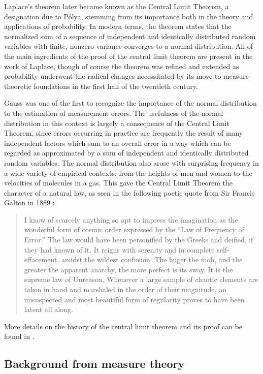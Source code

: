 \documentclass{svjour3}
\begin{document}
Laplace's theorem later became known as the Central Limit Theorem, a designation due to P\'olya, stemming from its importance both in the theory and applications of probability. In modern terms, the theorem states that the normalized sum of a sequence of independent and identically distributed random variables with finite, nonzero variance converges to a normal distribution. All of the main ingredients of the proof of the central limit theorem are present in the work of Laplace, though of course the theorem was refined and extended as probability underwent the radical changes necessitated by its move to measure-theoretic foundations in the first half of the twentieth century.

Gauss was one of the first to recognize the importance of the normal distribution to the estimation of measurement errors. The usefulness of the normal distribution in this context is largely a consequence of the Central Limit Theorem, since errors occurring in practice are frequently the result of many independent factors which sum to an overall error in a way which can be regarded as approximated by a sum of independent and identically distributed random variables. The normal distribution also arose with surprising frequency in a wide variety of empirical contexts, from the heights of men and women to the velocities of molecules in a gas. This gave the Central Limit Theorem the character of a natural law, as seen in the following poetic quote from Sir Francis Galton in 1889 \cite{galton:89}:
\begin{quote}
 I know of scarcely anything so apt to impress the imagination as the wonderful form of cosmic order expressed by the ``Law of Frequency of Error.'' The law would have been personified by the Greeks and deified, if they had known of it. It reigns with serenity and in complete self-effacement, amidst the wildest confusion. The huger the mob, and the greater the apparent anarchy, the more perfect is its sway. It is the supreme law of Unreason. Whenever a large sample of chaotic elements are taken in hand and marshaled in the order of their magnitude, an unsuspected and most beautiful form of regularity proves to have been latent all along.
\end{quote}
More details on the history of the central limit theorem and its proof can be found in \cite{fischer:11}.

\subsection{Background from measure theory}
\label{subsection:background}
\end{document}
